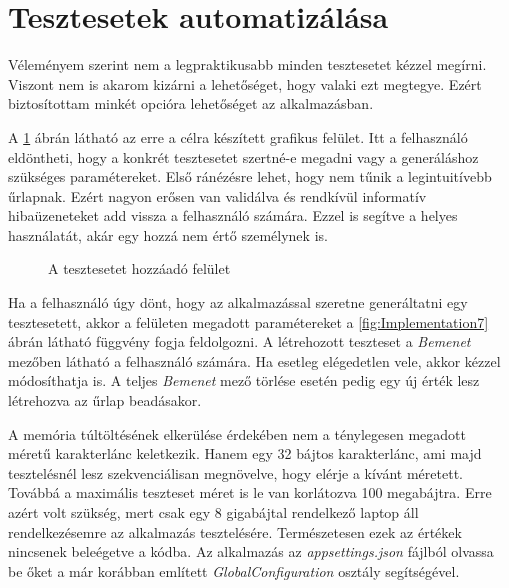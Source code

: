 \documentclass[12pt]{report} %
\begin{document}
\section{Tesztesetek automatizálása} %

Véleményem szerint nem a legpraktikusabb minden tesztesetet kézzel megírni. Viszont nem is akarom kizárni a lehetőséget, hogy valaki ezt megtegye. Ezért biztosítottam minkét opcióra lehetőséget az alkalmazásban.

A \ref{fig:Implementation6} ábrán látható az erre a célra készített grafikus felület. Itt a felhasználó eldöntheti, hogy a konkrét tesztesetet szertné-e megadni vagy a generáláshoz szükséges paramétereket. Első ránézésre lehet, hogy nem tűnik a legintuitívebb űrlapnak. Ezért nagyon erősen van validálva és rendkívül informatív hibaüzeneteket add vissza a felhasználó számára. Ezzel is segítve a helyes használatát, akár egy hozzá nem értő személynek is.

\begin{figure}[H]
    \centering %
    \caption{A tesztesetet hozzáadó felület} %
    \label{fig:Implementation6} %
\end{figure}

Ha a felhasználó úgy dönt, hogy az alkalmazással szeretne generáltatni egy tesztesetett, akkor a felületen megadott paramétereket a \ref{fig:Implementation7} ábrán látható függvény fogja feldolgozni. A létrehozott teszteset a \textit{Bemenet} mezőben látható a felhasználó számára. Ha esetleg elégedetlen vele, akkor kézzel módosíthatja is. A teljes \textit{Bemenet} mező törlése esetén pedig egy új érték lesz létrehozva az űrlap beadásakor.

A memória túltöltésének elkerülése érdekében nem a ténylegesen megadott méretű karakterlánc keletkezik. Hanem egy 32 bájtos karakterlánc, ami majd tesztelésnél lesz szekvenciálisan megnövelve, hogy elérje a kívánt méretett. Továbbá a maximális teszteset méret is le van korlátozva 100 megabájtra. Erre azért volt szükség, mert csak egy 8 gigabájtal rendelkező laptop áll rendelkezésemre az alkalmazás tesztelésére. Természetesen ezek az értékek nincsenek beleégetve a kódba. Az alkalmazás az \textit{appsettings.json} fájlból olvassa be őket a már korábban említett \textit{GlobalConfiguration} osztály segítségével.
\end{document}
